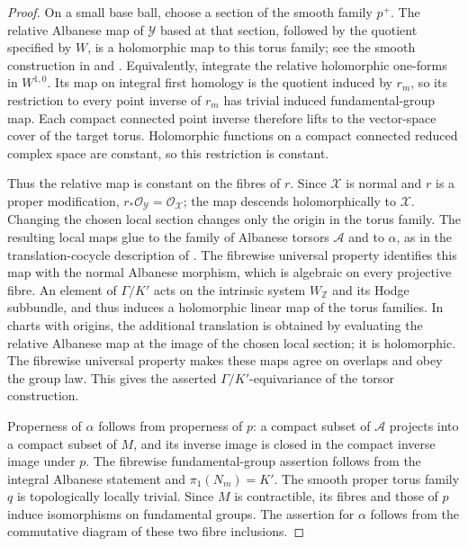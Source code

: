\begin{proof}
On a small base ball, choose a section of the smooth family $p^+$.
The relative Albanese map of $\mathcal Y$ based at that section,
followed by the quotient specified by $W$, is a holomorphic map to
this torus family; see the smooth construction in
\cite[\S1.4]{Fujiki1983} and
\cite[II, \S2(a) and Example~(2.15)]{Griffiths1968}.  Equivalently, integrate the relative holomorphic
one-forms in $W^{1,0}$.  Its map on integral first homology is the
quotient induced by $r_m$, so its restriction to every point inverse
of $r_m$ has trivial induced fundamental-group map.  Each compact
connected point inverse therefore lifts to the vector-space cover of
the target torus.  Holomorphic functions on a compact connected
reduced complex space are constant, so this restriction is constant.

Thus the relative map is constant on the fibres of $r$.  Since
$\mathcal X$ is normal and $r$ is a proper modification,
$r_*\mathcal O_{\mathcal Y}=\mathcal O_{\mathcal X}$; the map descends
holomorphically to $\mathcal X$.  Changing the chosen local section
changes only the origin in the torus family.  The resulting local
maps glue to the family of Albanese torsors $\mathcal A$ and to
$\alpha$, as in the translation-cocycle description of
\cite[\S2.2, Proposition~2.1]{Claudon2018}.  The fibrewise universal property identifies this map with
the normal Albanese morphism, which is algebraic on every projective
fibre.  An element of $\Gamma/K'$ acts on the intrinsic system
$W_{\mathbb Z}$ and its Hodge subbundle, and thus induces a
holomorphic linear map of the torus families.  In charts with origins,
the additional translation is obtained by evaluating the relative
Albanese map at the image of the chosen local section; it is
holomorphic.  The fibrewise universal property makes these maps agree
on overlaps and obey the group law.  This gives the asserted
$\Gamma/K'$-equivariance of the torsor construction.

Properness of $\alpha$ follows from properness of $p$: a compact
subset of $\mathcal A$ projects into a compact subset of $M$, and its
inverse image is closed in the compact inverse image under $p$.
The fibrewise fundamental-group assertion follows from the integral
Albanese statement and $\pi_1(N_m)=K'$.  The smooth proper torus family
$q$ is topologically locally trivial.  Since $M$ is contractible, its
fibres and those of $p$ induce isomorphisms on fundamental groups.
The assertion for $\alpha$ follows from the commutative diagram of
these two fibre inclusions.
\end{proof}

